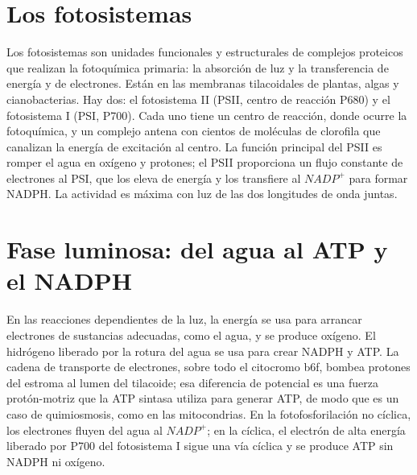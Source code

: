 \documentclass{book}
\begin{document}

\section{Los fotosistemas}

Los fotosistemas son unidades funcionales y estructurales de complejos proteicos que realizan la fotoquímica primaria: la absorción de luz y la transferencia de energía y de electrones. Están en las membranas tilacoidales de plantas, algas y cianobacterias. Hay dos: el fotosistema II (PSII, centro de reacción P680) y el fotosistema I (PSI, P700). Cada uno tiene un centro de reacción, donde ocurre la fotoquímica, y un complejo antena con cientos de moléculas de clorofila que canalizan la energía de excitación al centro. La función principal del PSII es romper el agua en oxígeno y protones; el PSII proporciona un flujo constante de electrones al PSI, que los eleva de energía y los transfiere al \(NADP^{+}\) para formar NADPH. La actividad es máxima con luz de las dos longitudes de onda juntas.


\section{Fase luminosa: del agua al ATP y el NADPH}

En las reacciones dependientes de la luz, la energía se usa para arrancar electrones de sustancias adecuadas, como el agua, y se produce oxígeno. El hidrógeno liberado por la rotura del agua se usa para crear NADPH y ATP. La cadena de transporte de electrones, sobre todo el citocromo b6f, bombea protones del estroma al lumen del tilacoide; esa diferencia de potencial es una fuerza protón-motriz que la ATP sintasa utiliza para generar ATP, de modo que es un caso de quimiosmosis, como en las mitocondrias. En la fotofosforilación no cíclica, los electrones fluyen del agua al \(NADP^{+}\); en la cíclica, el electrón de alta energía liberado por P700 del fotosistema I sigue una vía cíclica y se produce ATP sin NADPH ni oxígeno.

\end{document}
